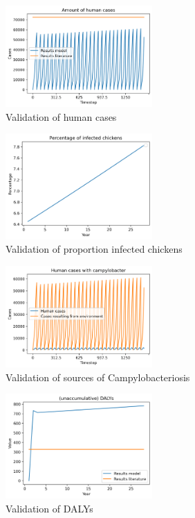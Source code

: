 \begin{figure}[!ht]
	\centering
	\includegraphics[width=0.5\textwidth]{notebooks/human_cases.png}
	\caption{Validation of human cases}
	\label{fig:val_human_cases}
\end{figure}

\begin{figure}[!ht]
	\centering
	\includegraphics[width=0.5\textwidth]{notebooks/chickens.png}
	\caption{Validation of proportion infected chickens}
	\label{fig:val_chickens}
\end{figure}

\begin{figure}[!ht]
	\centering
	\includegraphics[width=0.5\textwidth]{notebooks/source.png}
	\caption{Validation of sources of Campylobacteriosis}
	\label{fig:val_sources}
\end{figure}

\begin{figure}[!ht]
	\centering
	\includegraphics[width=0.5\textwidth]{notebooks/dalys.png}
	\caption{Validation of DALYs}
	\label{fig:val_dalys}
\end{figure}

